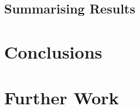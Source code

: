 \documentclass[letter, 11pt]{article}
\begin{document}
\subsection{Summarising Results}

\newpage
\section{Conclusions}

\newpage
\section{Further Work}

\newpage
{}
\end{document}
